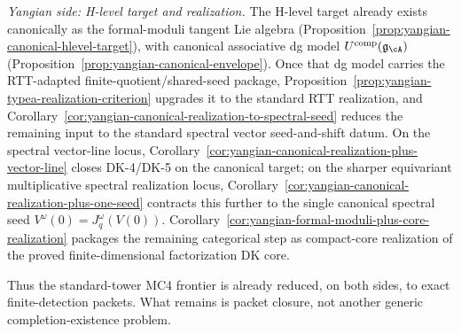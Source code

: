 \begin{proposition}
\begin{enumerate}[label=\textup{(\alph*)}]
  \emph{Yangian side: H-level target and realization.}
  The H-level target already exists canonically as the
  formal-moduli tangent Lie algebra
  (Proposition~\ref{prop:yangian-canonical-hlevel-target}), with
  canonical associative dg model
  $U^{\mathrm{comp}}(\mathfrak{g}_{\cA})$
  (Proposition~\ref{prop:yangian-canonical-envelope}).
  Once that dg model carries the RTT-adapted
  finite-quotient/shared-seed package,
  Proposition~\ref{prop:yangian-typea-realization-criterion} upgrades
  it to the standard RTT realization, and
  Corollary~\ref{cor:yangian-canonical-realization-to-spectral-seed}
  reduces the remaining input to the standard spectral vector
  seed-and-shift datum.  On the spectral vector-line locus,
  Corollary~\ref{cor:yangian-canonical-realization-plus-vector-line}
  closes DK-4/DK-5 on the canonical target; on the sharper
  equivariant multiplicative spectral realization locus,
  Corollary~\ref{cor:yangian-canonical-realization-plus-one-seed}
  contracts this further to the single canonical spectral seed
  $V^\omega(0)=J_q^\omega(V(0))$.
  Corollary~\ref{cor:yangian-formal-moduli-plus-core-realization}
  packages the remaining categorical step as compact-core realization
  of the proved finite-dimensional factorization DK core.
\end{enumerate}
Thus the standard-tower MC4 frontier is already reduced, on both sides,
to exact finite-detection packets.  What remains is packet closure, not
another generic completion-existence problem.
\end{proposition}

